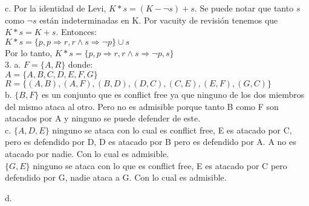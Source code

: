 c. Por la identidad de Levi, $K*s = (K - \neg s) + s$. Se puede notar que tanto $s$ como $\neg s$ están indeterminadas en K. Por vacuity de revisión tenemos que $K*s = K+s$. Entonces: \\

$K*s = \{p, p \Longrightarrow r , r \land s \Longrightarrow \neg p \} \cup {s} $\\

Por lo tanto, $K*s = \{p, p \Longrightarrow r , r \land s \Longrightarrow \neg p, s \}$ \\

3. a. $F=\{A, R\}$ donde: \\
$A=\{A, B, C, D, E, F, G\}$ \\
$R=\{(A, B), (A, F), (B, D), (D, C), (C, E), (E, F), (G, C)\}$ \\

b. $\{B, F\}$ es un conjunto que es conflict free ya que ninguno de los dos miembros del mismo ataca al otro. Pero no es admisible porque tanto B como F son atacados por A y ninguno se puede defender de este.\\

c. $\{A, D, E\}$ ninguno se ataca con lo cual es conflict free, E es atacado por C, pero es defendido por D, D es atacado por B pero es defendido por A. A no es atacado por nadie. Con lo cual es admisible. \\

$\{G, E\}$ ninguno se ataca con lo que es conflict free, E es atacado por C pero defendido por G, nadie ataca a G. Con lo cual es admisible.

d. 

\bigskip